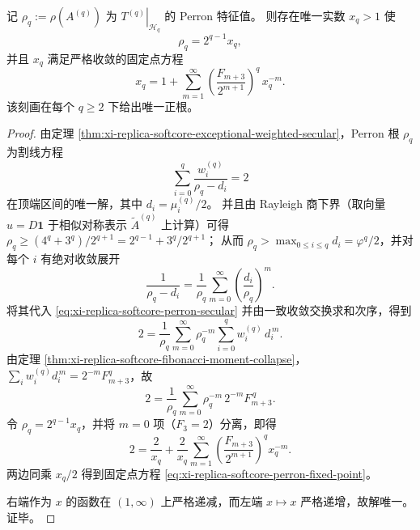 \begin{theorem}\label{thm:xi-replica-softcore-perron-fibonacci-fixed-point}
记 \(\rho_q:=\rho(A^{(q)})\) 为 \(\left.T^{(q)}\right|_{\mathcal H_q}\) 的 Perron 特征值。
则存在唯一实数 \(x_q>1\) 使
\[
\rho_q=2^{q-1}x_q,
\]
并且 \(x_q\) 满足严格收敛的固定点方程
\begin{equation}\label{eq:xi-replica-softcore-perron-fixed-point}
x_q
=1+\sum_{m=1}^{\infty}\left(\frac{F_{m+3}}{2^{m+1}}\right)^{q}\,x_q^{-m}.
\end{equation}
该刻画在每个 \(q\ge 2\) 下给出唯一正根。
\end{theorem}
\begin{proof}
由定理 \ref{thm:xi-replica-softcore-exceptional-weighted-secular}，Perron 根 \(\rho_q\) 为割线方程
\begin{equation}\label{eq:xi-replica-softcore-perron-secular}
\sum_{i=0}^{q}\frac{w_i^{(q)}}{\rho_q-d_i}=2
\end{equation}
在顶端区间的唯一解，其中 \(d_i=\mu_i^{(q)}/2\)。
并且由 Rayleigh 商下界（取向量 \(u=D\mathbf 1\) 于相似对称表示 \(\widetilde A^{(q)}\) 上计算）可得
\(
\rho_q\ge (4^q+3^q)/2^{q+1}
=2^{q-1}+3^q/2^{q+1}
\)；
从而 \(\rho_q>\max_{0\le i\le q}d_i=\varphi^q/2\)，并对每个 \(i\) 有绝对收敛展开
\[
\frac{1}{\rho_q-d_i}
=\frac{1}{\rho_q}\sum_{m=0}^{\infty}\left(\frac{d_i}{\rho_q}\right)^{m}.
\]
将其代入 \eqref{eq:xi-replica-softcore-perron-secular} 并由一致收敛交换求和次序，得到
\[
2
=\frac{1}{\rho_q}\sum_{m=0}^{\infty}\rho_q^{-m}\sum_{i=0}^{q} w_i^{(q)}\,d_i^{\,m}.
\]
由定理 \ref{thm:xi-replica-softcore-fibonacci-moment-collapse}，
\(
\sum_i w_i^{(q)}d_i^{\,m}=2^{-m}F_{m+3}^q
\)，故
\[
2
=\frac{1}{\rho_q}\sum_{m=0}^{\infty}\rho_q^{-m}\,2^{-m}F_{m+3}^{\,q}.
\]
令 \(\rho_q=2^{q-1}x_q\)，并将 \(m=0\) 项（\(F_3=2\)）分离，即得
\[
2
=\frac{2}{x_q}+ \frac{2}{x_q}\sum_{m=1}^{\infty}\left(\frac{F_{m+3}}{2^{m+1}}\right)^{q}x_q^{-m}.
\]
两边同乘 \(x_q/2\) 得到固定点方程 \eqref{eq:xi-replica-softcore-perron-fixed-point}。

右端作为 \(x\) 的函数在 \((1,\infty)\) 上严格递减，而左端 \(x\mapsto x\) 严格递增，故解唯一。证毕。
\end{proof}

